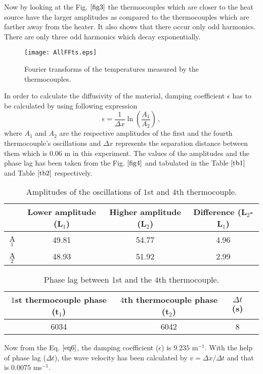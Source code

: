 \documentclass[12pt,a4]{article}
\begin{document}
Now by looking at the Fig. $\ref{fig3}$ the thermocouples which are closer to the heat source have the larger amplitudes as compared to the thermocouples which are farther away from the heater. It also shows that there occur only odd harmonics. There are only three odd harmonics which decay exponentially.
\begin{figure}[!ht]
\begin{center}
\texttt{[image: AllFFts.eps]}\\
\caption{Fourier transforms of the temperatures measured by the thermocouples. } \label{fig3}
\end{center}
\end{figure}
\newpage
In order to calculate the diffusivity of the material, damping coefficient $\epsilon$ has to be calculated by using following expression
\begin{equation}
\epsilon=\frac{1}{\Delta x}\ln(\frac{A_1}{A_2}) \, , \label{eq6}
\end{equation} 
where $A_1$ and $A_2$ are the respective amplitudes of the first and the fourth thermocouple's oscillations and $\Delta x$ represents the separation distance between them which is $0.06$ m in this experiment. The values of the amplitudes and the phase lag has been taken from the Fig. $\ref{fig4}$ and tabulated in the Table $\ref{tb1}$ and Table $\ref{tb2}$ respectively.

\begin{table}[!h]
\caption{Amplitudes of the oscillations of $1$st and $4$th thermocouple.} \label{tb1}

\centering

\begin{tabular}{ |c|c|c|c| } 
 \hline
   & Lower amplitude (L$_1$) & Higher amplitude (L$_2$) & Difference (L$_2$-L$_1$)\\ 
 \hline
 A$_1$ & 49.81 & 54.77 & 4.96\\ 
 \hline
 A$_2$ & 48.93 & 51.92 & 2.99\\
 \hline

\end{tabular}

\end{table}
\begin{table}[!h]
\caption{Phase lag between $1$st and the $4$th thermocouple.} \label{tb2}

\centering

\begin{tabular}{ |c|c|c|c| } 
 \hline
   $1$st thermocouple phase (t$_1$) & $4$th thermocouple phase (t$_2$) & $\Delta t$(s)\\ 
 \hline
  6034 & 6042 & 8\\ 
 
 \hline
\end{tabular}
\end{table}
Now from the Eq. $\ref{eq6}$, the damping coefficient ($\epsilon$) is $9.235$ m$^{-1}$. With the help of phase lag ($\Delta t$), the wave velocity has been calculated by $v=\Delta x/\Delta t$ and that is $0.0075$ ms$^{-1}$.
\end{document}
